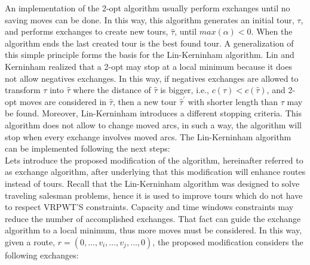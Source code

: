 An implementation of the 2-opt algorithm usually perform exchanges until no saving moves can be done. In this way, this algorithm generates an initial tour, $\tau$, and performs exchanges to create new tours, $\hat{\tau}$, until $max(\alpha)<0$. When the algorithm ends the last created tour is the best found tour. A generalization of this simple principle forms the basis for the Lin-Kerninham algorithm. Lin and Kerninham realized that a 2-opt may stop at a local minimum because it does not allow negatives exchanges. In this way, if negatives exchanges are allowed to transform $\tau$ into $\hat{\tau}$ where the distance of $\hat{\tau}$ is bigger, i.e., $c(\tau) < c(\hat{\tau})$, and 2-opt moves are considered in $\hat{\tau}$, then a new tour $\hat{\tau}^{'}$ with shorter length than $\tau$ may be found. Moreover, Lin-Kerninham introduces a different stopping criteria. This algorithm does not allow to change moved arcs, in such a way, the algorithm will stop when every exchange involves moved arcs. The Lin-Kerninham algorithm can be implemented following the next steps:\\





Lets introduce the proposed modification of the algorithm, hereinafter referred to as exchange algorithm, after underlying that this modification will enhance routes instead of tours. Recall that the Lin-Kerninham algorithm was designed to solve traveling salesman problems, hence it is used to improve tours which do not have to respect VRPWT'S constraints. Capacity and time windows constraints may reduce the number of accomplished exchanges. That fact can guide the exchange algorithm to a local minimum, thus more moves must be considered. In this way, given a route, $r=(0,\dots,v_{i},\dots,v_{j},\dots,0)$, %
the proposed modification considers the following exchanges:

